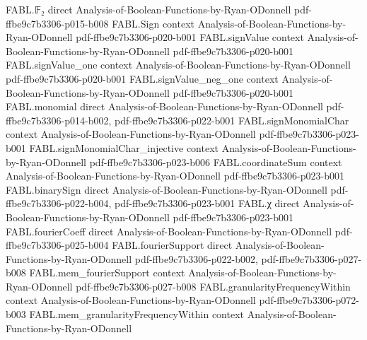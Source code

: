 \begin{theorem}
\label{FABL.widthThreeTseitin_eval_iff_exists}
\leanok
{}
\proofstep
  {FABL.𝔽₂}
  {direct}
  {Analysis-of-Boolean-Functions-by-Ryan-ODonnell}
  {pdf-ffbe9c7b3306-p015-b008}
\proofstep
  {FABL.Sign}
  {context}
  {Analysis-of-Boolean-Functions-by-Ryan-ODonnell}
  {pdf-ffbe9c7b3306-p020-b001}
\proofstep
  {FABL.signValue}
  {context}
  {Analysis-of-Boolean-Functions-by-Ryan-ODonnell}
  {pdf-ffbe9c7b3306-p020-b001}
\proofstep
  {FABL.signValue_one}
  {context}
  {Analysis-of-Boolean-Functions-by-Ryan-ODonnell}
  {pdf-ffbe9c7b3306-p020-b001}
\proofstep
  {FABL.signValue_neg_one}
  {context}
  {Analysis-of-Boolean-Functions-by-Ryan-ODonnell}
  {pdf-ffbe9c7b3306-p020-b001}
\proofstep
  {FABL.monomial}
  {direct}
  {Analysis-of-Boolean-Functions-by-Ryan-ODonnell}
  {pdf-ffbe9c7b3306-p014-b002,
    pdf-ffbe9c7b3306-p022-b001}
\proofstep
  {FABL.signMonomialChar}
  {context}
  {Analysis-of-Boolean-Functions-by-Ryan-ODonnell}
  {pdf-ffbe9c7b3306-p023-b001}
\proofstep
  {FABL.signMonomialChar_injective}
  {context}
  {Analysis-of-Boolean-Functions-by-Ryan-ODonnell}
  {pdf-ffbe9c7b3306-p023-b006}
\proofstep
  {FABL.coordinateSum}
  {context}
  {Analysis-of-Boolean-Functions-by-Ryan-ODonnell}
  {pdf-ffbe9c7b3306-p023-b001}
\proofstep
  {FABL.binarySign}
  {direct}
  {Analysis-of-Boolean-Functions-by-Ryan-ODonnell}
  {pdf-ffbe9c7b3306-p022-b004,
    pdf-ffbe9c7b3306-p023-b001}
\proofstep
  {FABL.χ}
  {direct}
  {Analysis-of-Boolean-Functions-by-Ryan-ODonnell}
  {pdf-ffbe9c7b3306-p023-b001}
\proofstep
  {FABL.fourierCoeff}
  {direct}
  {Analysis-of-Boolean-Functions-by-Ryan-ODonnell}
  {pdf-ffbe9c7b3306-p025-b004}
\proofstep
  {FABL.fourierSupport}
  {direct}
  {Analysis-of-Boolean-Functions-by-Ryan-ODonnell}
  {pdf-ffbe9c7b3306-p022-b002,
    pdf-ffbe9c7b3306-p027-b008}
\proofstep
  {FABL.mem_fourierSupport}
  {context}
  {Analysis-of-Boolean-Functions-by-Ryan-ODonnell}
  {pdf-ffbe9c7b3306-p027-b008}
\proofstep
  {FABL.granularityFrequencyWithin}
  {context}
  {Analysis-of-Boolean-Functions-by-Ryan-ODonnell}
  {pdf-ffbe9c7b3306-p072-b003}
\proofstep
  {FABL.mem_granularityFrequencyWithin}
  {context}
  {Analysis-of-Boolean-Functions-by-Ryan-ODonnell}

\end{theorem}
